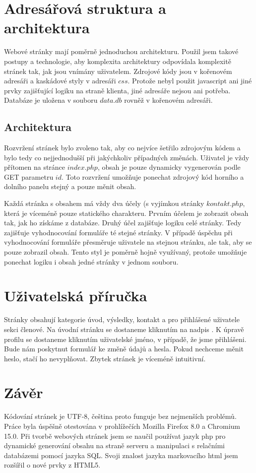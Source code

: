 \documentclass[12pt]{article}
\begin{document}
\section{Adresářová struktura a architektura}
Webové stránky mají poměrně jednoduchou architekturu. Použil jsem takové
postupy a technologie, aby komplexita architektury odpovídala komplexitě
stránek tak, jak jsou vnímány uživatelem. Zdrojové kódy jsou v kořenovém
adresáři a kaskádové styly v adresáři $css$. Protože nebyl použit javascript
ani jiné prvky zajišťující logiku na straně klienta, jiné adresáře nejsou ani
potřeba. Databáze je uložena v souboru $data.db$ rovněž v kořenovém adresáři.

\subsection{Architektura}
Rozvržení stránek bylo zvoleno tak, aby co nejvíce šetřilo zdrojovým kódem
a bylo tedy co nejjednodušší při jakýchkoliv případných změnách. Uživatel je
vždy přítomen na stránce $index.php$, obsah je pouze dynamicky vygenerován
podle GET parametru $id$. Toto rozvržení umožňuje ponechat zdrojový kód horního
a dolního panelu stejný a pouze měnit obsah.

Každá stránka s obsahem má vždy dva účely (s vyjímkou stránky $kontakt.php$,
která je víceméně pouze statického charakteru. Prvním účelem je zobrazit obsah
tak, jak ho získáme z databáze. Druhý účel zajišťuje logiku celé stránky. Tedy
zajišťuje vyhodnocování formuláře té stejné stránky. V případě úspěchu při
vyhodnocování formuláře přesměruje uživatele na stejnou stránku, ale tak, aby
se pouze zobrazil obsah. Tento styl je poměrně hojně využívaný, protože
umožňuje ponechat logiku i obsah jedné stránky v jednom souboru.

\section{Uživatelská příručka}
Stránky obsahují kategorie úvod, výsledky, kontakt a pro přihlášené uživatele
sekci členové. Na úvodní stránku se dostaneme kliknutím na nadpis .
K úpravě profilu se dostaneme kliknutím uživatelské jméno, v případě, že jsme
přihlášeni. Bude nám poskytnut formulář ke změně údajů a hesla. Pokud nechceme
měnit heslo, stačí ho nevyplňovat. Zbytek stránek je víceméně intuitivní.

\section{Závěr}
Kódování stránek je UTF-8, čeština proto funguje bez nejmenších problémů.
Práce byla úspěšně otestována v prohlížečích Mozilla Firefox 8.0 a Chromium
15.0.  Při tvorbě webových stránek jsem se naučil používat jazyk php pro
dynamické generování obsahu na straně serveru a manipulaci s relačními
databázemi pomocí jazyka SQL. Svoji znalost jazyka markovacího html jsem
rozšířil o nové prvky z HTML5.
\end{document}
